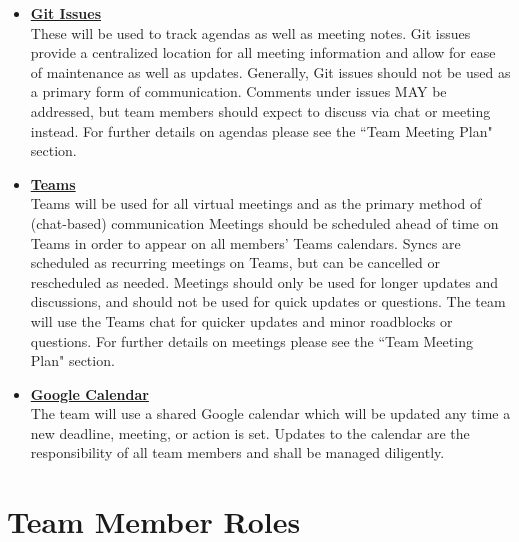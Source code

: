 \documentclass{article}
\begin{document}
\begin{itemize}
	\item \textbf{\underline{Git Issues}} \\
	These will be used to track agendas as well as meeting notes. 
	Git issues provide a centralized location for all meeting information and allow for ease of maintenance as well as updates. 
	Generally, Git issues should not be used as a primary form of communication.
	 Comments under issues MAY be addressed, but team members should expect to discuss via chat or meeting instead.
	For further details on agendas please see the ``Team Meeting Plan" section.\\
	\item \textbf{\underline{Teams}} \\
	Teams will be used for all virtual meetings and as the primary method of (chat-based) communication 
	Meetings should be scheduled ahead of time on Teams in order to appear on all members' Teams calendars.
	Syncs are scheduled as recurring meetings on Teams, but can be cancelled or rescheduled as needed.
	Meetings should only be used for longer updates and discussions, and should not be used for quick updates or questions.
	The team will use the Teams chat for quicker updates and minor roadblocks or questions.
	For further details on meetings please see the ``Team Meeting Plan" section. \\
	\item \textbf{\underline{Google Calendar}} \\
	The team will use a shared Google calendar which will be updated any time a new deadline, meeting, or action is set. 
	Updates to the calendar are the responsibility of all team members and shall be managed diligently. \\
\end{itemize}



\section{Team Member Roles}
\end{document}
